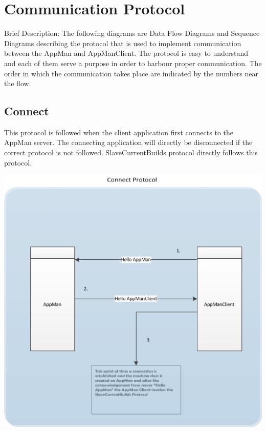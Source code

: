 \documentclass[a4paper,12pt,final]{article}
\begin{document}
\section{Communication Protocol}
Brief Description: The following diagrams are Data Flow Diagrams and Sequence Diagrams describing the protocol that is used to implement communication between the AppMan and AppManClient. The protocol is easy to understand and each of them serve a purpose in order to harbour proper communication. The order in which the communication takes place are indicated by the numbers near the flow.

\subsection{Connect}
This protocol is followed when the client application first connects to the AppMan server. The connecting application will directly be disconnected if the correct protocol is not followed. SlaveCurrentBuilds protocol directly follows this protocol.
\begin{center}
\includegraphics[scale=1.0]{CommunicationProtocol/ConnectProtocol.jpg} 
\end{center}
\end{document}
